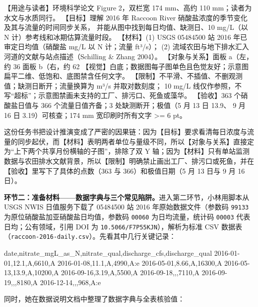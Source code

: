 \begin{Prompt}
【用途与读者】环境科学论文 Figure 2，双栏宽 174 mm、高约 110 mm；读者为水文与水质同行。
【目标】理解 2016 年 Raccoon River 硝酸盐浓度的季节变化及其与流量的时间同步关系，
并能从图中找到每日均值、缺测日、10 mg/L（以 N 计）参考线和冰期估算流量时段。
【材料】(1) USGS 05484500 站 2016 年已审定日均值（硝酸盐 mg/L 以 N 计；流量 ft³/s）；
(2) 流域农田与地下排水汇入河道的文献与站点描述（Schilling & Zhang 2004）。
【对象与关系】面板 a（左，约 36%
面板 b（右，约 62%
【视觉】白底；数据图每子图单色且色觉友好；示意图扁平二维、低饱和、底图禁含任何文字。
【限制】不平滑、不插值、不删观测值；缺测日断开；流量换算为 m³/s 并取对数刻度；
10 mg/L 线仅作参照，不写“超标”；示意图禁画未支持的工厂、排污口、死鱼或藻华。
【验收】363 个硝酸盐日值与 366 个流量日值齐备；3 处缺测断开；极值（5 月 13 日 13.9、
9 月 16 日 3.19）可核查；174 mm 宽印刷时所有文字 >= 6 pt。
\end{Prompt}

这份任务书把设计推演变成了严密的因果链：因为【目标】要求看清每日浓度与流量的同步起伏，而【材料】表明两者单位与量级不同，所以【对象与关系】直接定为“上下两个共享月份横轴的子图”，排除了双 Y 轴；因为【材料】只有单站监测数据与农田排水文献背景，所以【限制】明确禁止画出工厂、排污口或死鱼，并在【验收】里写下了具体的点数（363 与 366）和极值日期（5 月 13 日与 9 月 16 日）。

\textbf{环节二：准备材料——数据字典与三个常见陷阱。}进入第二环节，小林用脚本从 USGS NWIS 日值服务下载了 05484500 站 2016 年原始数据文件（参数码 \texttt{99133} 为原位硝酸盐加亚硝酸盐日均值，参数码 \texttt{00060} 为日均流量，统计码 \texttt{00003} 代表日均；公有领域，引用 DOI 为 \texttt{10.5066/F7P55KJN}），解析为标准 CSV 数据表（\texttt{raccoon-2016-daily.csv}）。先看其中几行关键记录：

\begin{Prompt}
date,nitrate_mgL_as_N,nitrate_qual,discharge_cfs,discharge_qual
2016-01-01,12.1,A,6610,A
2016-01-08,11.1,A,4990,A:e
2016-05-01,8.66,A,16300,A
2016-05-13,13.9,A,10200,A
2016-09-16,3.19,A,5500,A
2016-09-18,,,7110,A
2016-09-19,,,8180,A
2016-12-14,,,968,A:e
\end{Prompt}

同时，她在数据说明文档中整理了数据字典与全表核验值：

